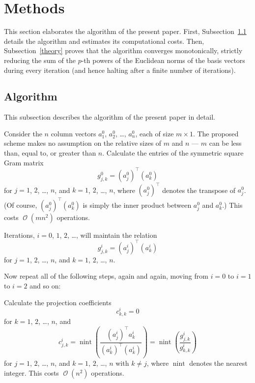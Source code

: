 \documentclass{article}
\DeclareMathOperator{\nint}{nint}
\DeclareMathOperator{\bigoh}{\mathcal{O}}
\begin{document}
\section{Methods}
\label{methods}

This section elaborates the algorithm of the present paper.
First, Subsection~\ref{algorithm} details the algorithm and estimates
its computational costs.
Then, Subsection~\ref{theory} proves that the algorithm
converges monotonically, strictly reducing the sum of the $p$-th powers
of the Euclidean norms of the basis vectors during every iteration
(and hence halting after a finite number of iterations).


\subsection{Algorithm}
\label{algorithm}

This subsection describes the algorithm of the present paper in detail.

Consider the $n$ column vectors $a^0_1$, $a^0_2$, \dots, $a^0_n$,
each of size $m \times 1$.
The proposed scheme makes no assumption on the relative sizes of $m$ and $n$
--- $m$ can be less than, equal to, or greater than $n$.
Calculate the entries of the symmetric square Gram matrix 
%
\begin{equation}
\label{Gram0}
g^0_{j,k} = (a^0_j)^\top (a^0_k)
\end{equation}
%
for $j = 1$, $2$, \dots, $n$, and $k = 1$, $2$, \dots, $n$,
where $(a^0_j)^\top$ denotes the transpose of $a^0_j$.
(Of course, $(a^0_j)^\top (a^0_k)$ is simply the inner product
between $a^0_j$ and $a^0_k$.)
This costs $\bigoh(mn^2)$ operations.

Iterations, $i = 0$, $1$, $2$, \dots, will maintain the relation
%
\begin{equation}
\label{Gram}
g^i_{j,k} = (a^i_j)^\top (a^i_k)
\end{equation}
%
for $j = 1$, $2$, \dots, $n$, and $k = 1$, $2$, \dots, $n$.

Now repeat all of the following steps, again and again,
moving from $i = 0$ to $i = 1$ to $i = 2$ and so on:

Calculate the projection coefficients
%
\begin{equation}
c^i_{k,k} = 0
\end{equation}
%
for $k = 1$, $2$, \dots, $n$, and
%
\begin{equation}
\label{coeffs}
c^i_{j,k} = \nint\left( \frac{(a^i_j)^\top a^i_k}
                             {(a^i_k)^\top (a^i_k)} \right)
          = \nint\left( \frac{g^i_{j,k}}{g^i_{k,k}} \right)
\end{equation}
%
for $j = 1$, $2$, \dots, $n$, and $k = 1$, $2$, \dots, $n$ with $k \ne j$,
where $\nint$ denotes the nearest integer.
This costs $\bigoh(n^2)$ operations.
\end{document}
